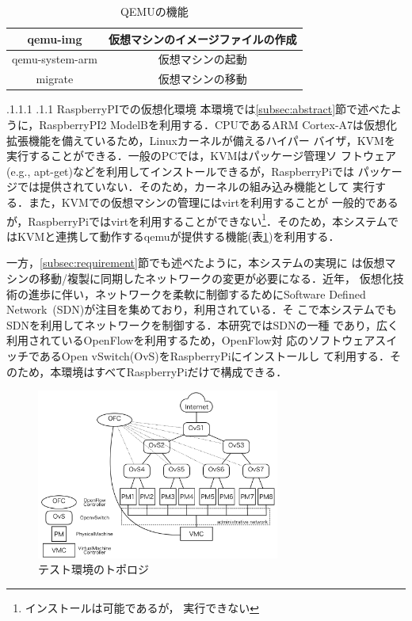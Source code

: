 \documentclass[a4paper, twocolumn]{jarticle}
\makeatletter
\def\subsection{\@startsection{subsection}{1}{\z@}%
 {.1\Cvs \@plus.1\Cdp \@minus.1\Cdp}%
 {.1\Cvs \@plus.1\Cdp}%
 {\normalfont\normalsize\bfseries}}
\makeatother
\begin{document}
\begin{table}[t]
	\centering
	\caption{QEMUの機能}
	\label{tab:qemu_func}
	{
		\small
		\begin{tabular}{|c|c|} \hline
		qemu-img & 仮想マシンのイメージファイルの作成\\ \hline
		qemu-system-arm & 仮想マシンの起動\\ \hline
		migrate & 仮想マシンの移動\\ \hline
		\end{tabular}
	}
\end{table}

\subsection{RaspberryPIでの仮想化環境}
本環境では\ref{subsec:abstract}節で述べたように，RaspberryPI2 ModelBを利用する．CPUであるARM
Cortex-A7は仮想化拡張機能を備えているため，Linuxカーネルが備えるハイパー
バイザ，KVMを実行することができる．一般のPCでは，KVMはパッケージ管理ソ
フトウェア(e.g., apt-get)などを利用してインストールできるが，RaspberryPiでは
パッケージでは提供されていない．そのため，カーネルの組み込み機能として
実行する．また，KVMでの仮想マシンの管理にはvirt\cite{virt}を利用することが
一般的であるが，RaspberryPiではvirtを利用することができない\footnote{インストールは可能であるが，
実行できない}．そのため，本システムではKVMと連携して動作するqemu\cite{qemu}が提供する機能(表\ref{tab:qemu_func})を利用する．

一方，\ref{subsec:requirement}節でも述べたように，本システムの実現に
は仮想マシンの移動/複製に同期したネットワークの変更が必要になる．近年，
仮想化技術の進歩に伴い，ネットワークを柔軟に制御するためにSoftware
Defined Network~(SDN)\cite{sdn}が注目を集めており，利用されている．そ
こで本システムでもSDNを利用してネットワークを制御する．本研究ではSDNの一種
であり，広く利用されているOpenFlow\cite{opf}を利用するため，OpenFlow対
応のソフトウェアスイッチであるOpen vSwitch(OvS)をRaspberryPiにインストールし
て利用する．そのため，本環境はすべてRaspberryPiだけで構成できる．

\begin{figure}[t]
	\includegraphics[width=8.0cm]{fig/topology.png}
	\caption{テスト環境のトポロジ}
	\label{fig:topology}
\end{figure}
\end{document}
